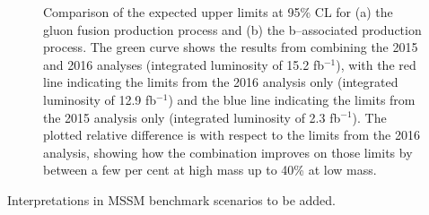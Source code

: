\begin{figure}[h!]
\begin{center}
\end{center}
\caption[Comparison of the expected upper limits at 95\% CL for the 
gluon fusion and b-associated production process, comparing the 2015 and 2016 analyses with a combination.]{Comparison of the expected upper limits at 95\% CL for (a) the gluon fusion production
process and (b) the b--associated production process. The green curve shows the results
from combining the 2015 and 2016 analyses (integrated luminosity of 15.2 fb$^{-1}$),
with the red line indicating the limits from the 2016 analysis only (integrated luminosity of 12.9 fb$^{-1}$)
and the blue line indicating the limits from the 2015 analysis only (integrated luminosity of 2.3 fb$^{-1}$).
The plotted relative difference is with respect to the limits from the 2016 analysis, showing how the combination
improves on those limits by between a few per cent at high mass up to 40\% at low mass.}
\label{fig:mssm_results_combination_limits_comp}
\end{figure}

Interpretations in MSSM benchmark scenarios to be added.




